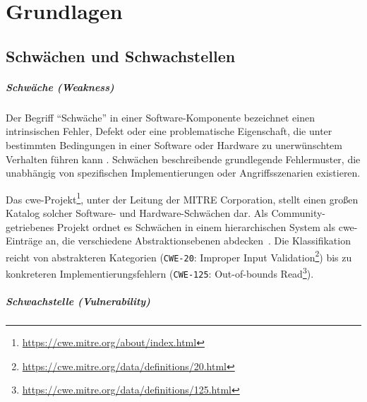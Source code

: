\chapter{Grundlagen}\label{ch:grundlagen}


\section{Schwächen und Schwachstellen}\label{sec:def-weakness-vulnerability}

\paragraph{Schwäche (Weakness)}

Der Begriff \enquote{Schwäche} in einer Software-Komponente bezeichnet einen intrinsischen Fehler, Defekt oder eine problematische Eigenschaft, die unter bestimmten Bedingungen in einer Software oder Hardware zu unerwünschtem Verhalten führen kann \autocite{Ross_Winstead_McEvilley_2022}.
Schwächen beschreibende grundlegende Fehlermuster, die unabhängig von spezifischen Implementierungen oder Angriffsszenarien existieren.

Das \acrfull{cwe}-Projekt\footnote{\url{https://cwe.mitre.org/about/index.html}}, unter der Leitung der MITRE Corporation, stellt einen großen Katalog solcher Software- und Hardware-Schwächen dar.
Als Community-getriebenes Projekt ordnet es Schwächen in einem hierarchischen System als \acrshort{cwe}-Einträge an, die verschiedene Abstraktionsebenen abdecken\ \autocite{wu2016cwe}.
Die Klassifikation reicht von abstrakteren Kategorien (\verb+CWE-20+: Improper Input Validation\footnote{\url{https://cwe.mitre.org/data/definitions/20.html}}) bis zu konkreteren Implementierungsfehlern (\verb+CWE-125+: Out-of-bounds Read\footnote{\url{https://cwe.mitre.org/data/definitions/125.html}}).

\paragraph{Schwachstelle (Vulnerability)}

